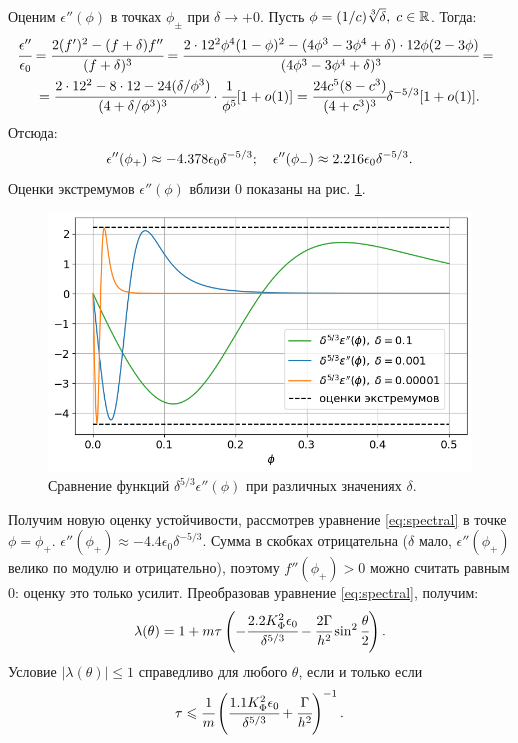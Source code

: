 Оценим $\epsilon''(\phi)$ в точках $\phi_{\pm}$ при $\delta \to +0$. Пусть $\phi = (1 / c) \sqrt[3]{\delta}, \; c \in {\mathbb{R}}$. Тогда:
\begin{multline*}
    \hspace{-2mm}
    \cfrac{\epsilon''}{\epsilon_0} = \cfrac{2(f')^2 - (f + \delta)f''}{(f + \delta)^3} = \cfrac{2 \cdot 12^2 \phi^4 (1 - \phi)^2 - (4 \phi^3 - 3 \phi^4 + \delta) \cdot 12 \phi (2 - 3 \phi)}{(4 \phi^3 - 3 \phi^4 + \delta)^3} = \\ = \cfrac{2 \cdot 12^2 - 8 \cdot 12 - 24 (\delta / \phi^3)}{(4 + \delta / \phi^3)^3} \cdot \cfrac{1}{\phi^5}[1 + o(1)] = \cfrac{24 c^5 (8 - c^3)}{(4 + c^3)^3} \delta^{-5 / 3} [1 + o(1)] \tpoint
\end{multline*}
Отсюда:
\begin{equation}
    \epsilon''(\phi_+) \approx -4.378 \epsilon_0 \delta^{-5 / 3}; \quad \epsilon''(\phi_-) \approx 2.216 \epsilon_0 \delta^{-5 / 3} {\text{.}}
    \label{est:epsilon_phi_phi_bounds}
\end{equation}
Оценки экстремумов $\epsilon''(\phi)$ вблизи $0$ показаны на рис. \ref{fig:eps_phi_phi_multiplied}.

\begin{figure}[!tp]
    \centering
    \includegraphics[width=\textwidth]{figures/eps_phi_phi_multiplied.png}
    \caption{Сравнение функций $\delta^{5 / 3} \epsilon''(\phi)$ при различных значениях $\delta$.}
    \label{fig:eps_phi_phi_multiplied}
\end{figure}

Получим новую оценку устойчивости, рассмотрев уравнение \eqref{eq:spectral} в точке $\phi = \phi_+$. $\epsilon''(\phi_+) \approx -4.4 \epsilon_0 \delta^{-5 / 3}$. Сумма в скобках отрицательна ($\delta$ мало, $\epsilon''(\phi_+)$ велико по модулю и отрицательно), поэтому $f''(\phi_+) > 0$ можно считать равным $0$: оценку это только усилит. Преобразовав уравнение \eqref{eq:spectral}, получим:
$$\lambda(\theta) = 1 + m \tau \left( -\cfrac{2.2 K_\Phi^2 \epsilon_0}{\delta^{5 / 3}} - \cfrac{2 \Gamma}{h^2} \sin^2 \cfrac{\theta}{2} \right) {\text{.}}$$
Условие $|\lambda(\theta)| \leqslant 1$ справедливо для любого $\theta$, если и только если
\begin{equation}
    \tau \leqslant \cfrac{1}{m} \left( \cfrac{1.1 K_\Phi^2 \epsilon_0}{\delta^{5 / 3}} + \cfrac{\Gamma}{h^2} \right)^{-1} {\text{.}}
    \label{cond:spectral_better_theoretical}
\end{equation}

